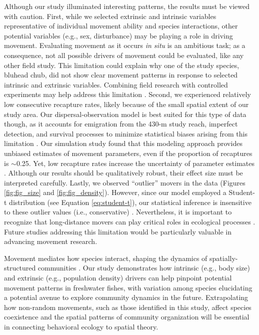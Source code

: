 \documentclass[11pt, class=article, crop=false]{standalone}
\begin{document}
Although our study illuminated interesting patterns, the results must be viewed with caution. First, while we selected extrinsic and intrinsic variables representative of individual movement ability and species interactions, other potential variables (e.g., sex, disturbance) may be playing a role in driving movement.
Evaluating movement as it occurs \textit{in situ} is an ambitious task; as a consequence, not all possible drivers of movement could be evaluated, like any other field study.
This limitation could explain why one of the study species, bluhead chub, did not show clear movement patterns in response to selected intrinsic and extrinsic variables.
Combining field research with controlled experiments may help address this limitation \citep{fronhoferBottomupTopdownControl2018, nathanMovementEcologyParadigm2008}.
Second, we experienced relatively low consecutive recapture rates, likely because of the small spatial extent of our study area. Our dispersal-observation model is best suited for this type of data though, as it accounts for emigration from the 430-m study reach, imperfect detection, and survival processes to minimize statistical biases arising from this limitation \citep{teruiModelingDispersalUsing2020}.
Our simulation study found that this modeling approach provides unbiased estimates of movement parameters, even if the proportion of recaptures is $\sim$0.25.
Yet, low recapture rates increase the uncertainty of parameter estimates \citep{teruiModelingDispersalUsing2020}.
Although our results should be qualitatively robust, their effect size must be interpreted carefully.
Lastly, we observed ``outlier'' movers in the data (Figures \ref{fig:fig_size} and \ref{fig:fig_density}). 
However, since our model employed a Student-t distribution (see Equation \ref{eq:student-t}), our statistical inference is insensitive to these outlier values (i.e., conservative) \citep{lunnBUGSBookPractical2012}. 
Nevertheless, it is important to recognize that long-distance movers can play critical roles in ecological processes \citep{clobertDispersalEcologyEvolution2012}.
Future studies addressing this limitation would be particularly valuable in advancing movement research.

Movement mediates how species interact, shaping the dynamics of spatially-structured communities \citep{schlagelMovementmediatedCommunityAssembly2020}. Our study demonstrates how intrinsic (e.g., body size) and extrinsic (e.g., population density) drivers can help pinpoint potential movement patterns in freshwater fishes, with variation among species elucidating a potential avenue to explore community dynamics in the future. Extrapolating how non-random movements, such as those identified in this study, affect species coexistence and the spatial patterns of community organization will be essential in connecting behavioral ecology to spatial theory.
\end{document}
